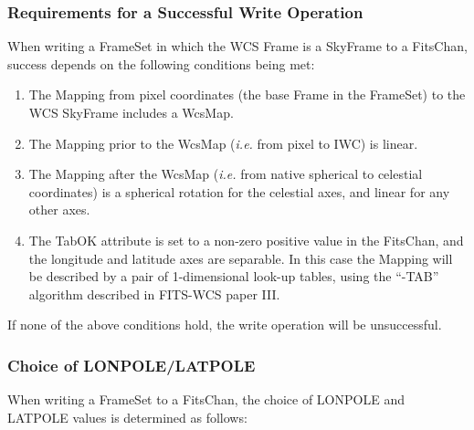 \documentclass[twoside,11pt]{article}
\begin{document}
\subsubsection{Requirements for a Successful Write Operation}
When writing a FrameSet in which the WCS
Frame is a SkyFrame to a
FitsChan, success depends on the following conditions
being met:

\begin{enumerate}
\item The Mapping from pixel coordinates (the base Frame
in the FrameSet) to the WCS SkyFrame includes a WcsMap.
\item The Mapping prior to the WcsMap (\emph{i.e.} from pixel to IWC) is linear.
\item The Mapping after the WcsMap (\emph{i.e.} from native spherical to
celestial coordinates) is a spherical rotation for the
celestial axes, and linear for any other axes.
\item The TabOK attribute is set to a non-zero positive value in the FitsChan,
and the longitude and latitude axes are separable. In this case the Mapping will
be described by a pair of 1-dimensional look-up tables, using the ``-TAB''
algorithm described in FITS-WCS paper III.
\end{enumerate}

If none of the above conditions hold, the write operation will be
unsuccessful.

\subsubsection{Choice of LONPOLE/LATPOLE}
When writing a FrameSet to a FitsChan,
the choice of LONPOLE and LATPOLE values is determined as follows:
\end{document}
